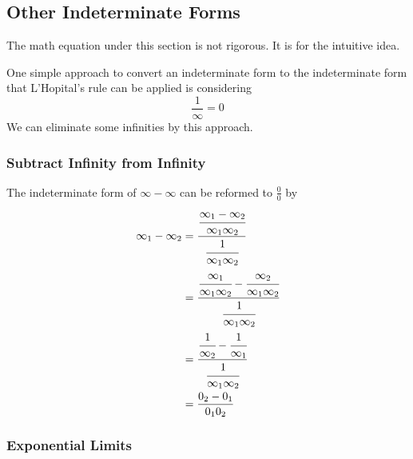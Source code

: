 \documentclass{note}
\begin{document}
\subsection{Other Indeterminate Forms}

\begin{warning}
  The math equation under this section is not rigorous. It is for the intuitive idea.
\end{warning}

One simple approach to convert an indeterminate form to the indeterminate form that L'Hopital's rule can be applied is considering
\[
  \frac{1}{\infty} = 0
\]
We can eliminate some infinities by this approach.

\subsubsection{Subtract Infinity from Infinity}

The indeterminate form of $\infty - \infty$ can be reformed to $\frac{0}{0}$ by
\begin{align*}
  \infty_1 - \infty_2
    & = \cfrac{\cfrac{\infty_1 - \infty_2}{\infty_1 \infty_2}}{\cfrac{1}{\infty_1 \infty_2}}                            \\
    & = \cfrac{\cfrac{\infty_1}{\infty_1 \infty_2} - \cfrac{\infty_2}{\infty_1 \infty_2}}{\cfrac{1}{\infty_1 \infty_2}} \\
    & = \cfrac{\cfrac{1}{\infty_2} - \cfrac{1}{\infty_1}}{\cfrac{1}{\infty_1 \infty_2}}                                 \\
    & = \frac{0_2 - 0_1}{0_1 0_2}
\end{align*}

\subsubsection{Exponential Limits}
\end{document}
